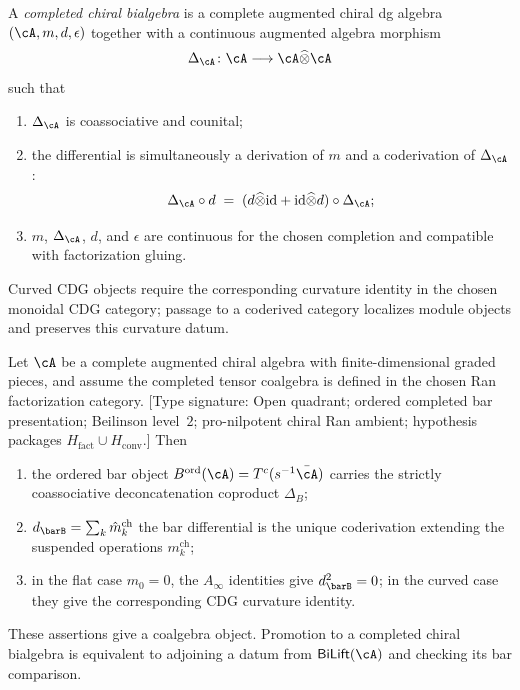 \begin{definition}
\label{def:coderived-chiral-bialgebra}%
%
%
%
A \emph{completed chiral bialgebra} is a complete augmented chiral
dg algebra $(\cA,m,d,\epsilon)$ together with a continuous augmented
algebra morphism
\[
 \Delta_{\cA}\colon\cA\longrightarrow
 \cA\widehat\otimes\cA
\]
such that
\begin{enumerate}[label=\textup{(\roman*)}]
\item $\Delta_{\cA}$ is coassociative and counital;
\item the differential is simultaneously a derivation of $m$ and a
coderivation of $\Delta_{\cA}$:
 \[
 \Delta_{\cA} \circ d
 \;=\;
 (d\widehat\otimes\id+\id\widehat\otimes d)
 \circ\Delta_{\cA};
 \]
\item $m$, $\Delta_{\cA}$, $d$, and $\epsilon$ are continuous for the
chosen completion and compatible with factorization gluing.
\end{enumerate}
Curved CDG objects require the corresponding curvature identity in
the chosen monoidal CDG category; passage to a coderived category
localizes module objects and preserves this curvature datum.
\end{definition}

\begin{proposition}
\label{prop:bar-is-coderived-chiral-bialgebra}%
%
%
Let $\cA$ be a complete augmented chiral algebra with
finite-dimensional graded pieces, and assume the completed tensor
coalgebra is defined in the chosen Ran factorization category.
\textup{[Type signature: Open quadrant; ordered completed bar
presentation; Beilinson level~$2$; pro-nilpotent chiral Ran ambient;
hypothesis packages $H_{\mathrm{fact}}\cup H_{\mathrm{conv}}$.]}
Then
\begin{enumerate}[label=\textup{(\alph*)}]
\item the ordered bar object
$B^{\mathrm{ord}}(\cA)=T^c(s^{-1}\bar\cA)$ carries the strictly
coassociative deconcatenation coproduct $\Delta_B$;
\item $d_{\barB} = \sum_k \hat{m}_k^{\mathrm{ch}}$ the bar
 differential is the unique coderivation extending the suspended
 operations $m_k^{\mathrm{ch}}$;
\item in the flat case $m_0=0$, the $A_\infty$ identities give
$d_{\barB}^2=0$; in the curved case they give the corresponding CDG
curvature identity.
\end{enumerate}
These assertions give a coalgebra object.  Promotion to a completed
chiral bialgebra is equivalent to adjoining a datum from
$\mathsf{BiLift}(\cA)$ and checking its bar comparison.
\end{proposition}


